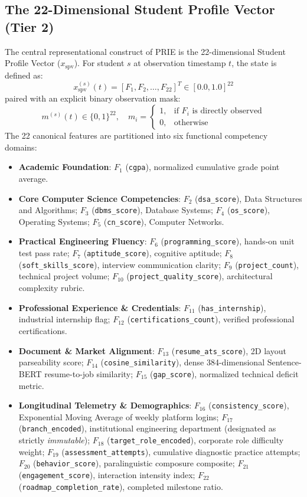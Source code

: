 \documentclass[conference]{IEEEtran}
\begin{document}
\subsection{The 22-Dimensional Student Profile Vector (Tier 2)}
The central representational construct of PRIE is the 22-dimensional Student Profile Vector ($x_{\text{spv}}$). For student $s$ at observation timestamp $t$, the state is defined as:
\begin{equation}
x_{\text{spv}}^{(s)}(t) = [F_1, F_2, \dots, F_{22}]^T \in [0.0, 1.0]^{22}
\end{equation}
paired with an explicit binary observation mask:
\begin{equation}
m^{(s)}(t) \in \{0, 1\}^{22}, \quad m_i = \begin{cases} 1, & \text{if } F_i \text{ is directly observed} \\ 0, & \text{otherwise} \end{cases}
\end{equation}
The 22 canonical features are partitioned into six functional competency domains:
\begin{itemize}
\item \textbf{Academic Foundation}: $F_1$ (\texttt{cgpa}), normalized cumulative grade point average.
\item \textbf{Core Computer Science Competencies}: $F_2$ (\texttt{dsa\_score}), Data Structures and Algorithms; $F_3$ (\texttt{dbms\_score}), Database Systems; $F_4$ (\texttt{os\_score}), Operating Systems; $F_5$ (\texttt{cn\_score}), Computer Networks.
\item \textbf{Practical Engineering Fluency}: $F_6$ (\texttt{programming\_score}), hands-on unit test pass rate; $F_7$ (\texttt{aptitude\_score}), cognitive aptitude; $F_8$ (\texttt{soft\_skills\_score}), interview communication clarity; $F_9$ (\texttt{project\_count}), technical project volume; $F_{10}$ (\texttt{project\_quality\_score}), architectural complexity rubric.
\item \textbf{Professional Experience \& Credentials}: $F_{11}$ (\texttt{has\_internship}), industrial internship flag; $F_{12}$ (\texttt{certifications\_count}), verified professional certifications.
\item \textbf{Document \& Market Alignment}: $F_{13}$ (\texttt{resume\_ats\_score}), 2D layout parseability score; $F_{14}$ (\texttt{cosine\_similarity}), dense 384-dimensional Sentence-BERT resume-to-job similarity; $F_{15}$ (\texttt{gap\_score}), normalized technical deficit metric.
\item \textbf{Longitudinal Telemetry \& Demographics}: $F_{16}$ (\texttt{consistency\_score}), Exponential Moving Average of weekly platform logins; $F_{17}$ (\texttt{branch\_encoded}), institutional engineering department (designated as strictly \textit{immutable}); $F_{18}$ (\texttt{target\_role\_encoded}), corporate role difficulty weight; $F_{19}$ (\texttt{assessment\_attempts}), cumulative diagnostic practice attempts; $F_{20}$ (\texttt{behavior\_score}), paralinguistic composure composite; $F_{21}$ (\texttt{engagement\_score}), interaction intensity index; $F_{22}$ (\texttt{roadmap\_completion\_rate}), completed milestone ratio.
\end{itemize}
\end{document}

